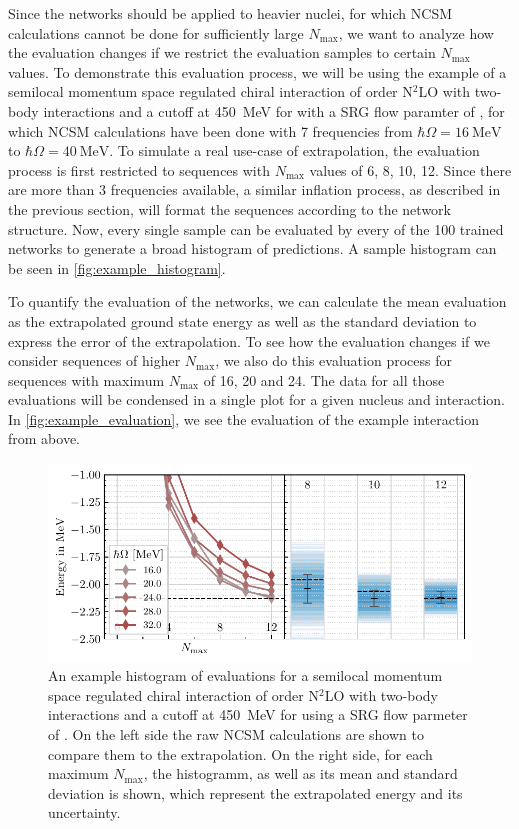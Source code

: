 Since the networks should be applied to heavier nuclei, for which NCSM calculations cannot be done for sufficiently large $N_\mathrm{max}$, we want to analyze how the evaluation changes if we restrict the evaluation samples to certain $N_\mathrm{max}$ values. To demonstrate this evaluation process, we will be using the example of a semilocal momentum space regulated chiral interaction of order N$^{2}$LO with two-body interactions and a cutoff at \SI{450}{\mega\electronvolt} for  with a SRG flow paramter of  \cite{smsquelle}, for which NCSM calculations have been done with 7 frequencies from $\hbar\Omega = \SI{16}{\mega\electronvolt}$ to $\hbar\Omega = \SI{40}{\mega\electronvolt}$. To simulate a real use-case of extrapolation, the evaluation process is first restricted to sequences with $N_\mathrm{max}$ values of 6, 8, 10, 12. Since there are more than 3 frequencies available, a similar inflation process, as described in the previous section, will format the sequences according to the network structure. Now, every single sample can be evaluated by every of the 100 trained networks to generate a broad histogram of predictions. A sample histogram can be seen in \autoref{fig:example_histogram}.


To quantify the evaluation of the networks, we can calculate the mean evaluation as the extrapolated ground state energy as well as the standard deviation to express the error of the extrapolation. To see how the evaluation changes if we consider sequences of higher $N_\mathrm{max}$, we also do this evaluation process for sequences with maximum $N_\mathrm{max}$ of 16, 20 and 24. The data for all those evaluations will be condensed in a single plot for a given nucleus and interaction. In \autoref{fig:example_evaluation}, we see the evaluation of the example interaction from above.

\begin{figure}[H]
  \centering
  \includegraphics[]{media/example_evaluation.pdf}
  \caption{An example histogram of evaluations for a semilocal momentum space regulated chiral interaction of order N$^{2}$LO with two-body interactions and a cutoff at \SI{450}{\mega\electronvolt} \cite{smsquelle} for  using a SRG flow parmeter of . On the left side the raw NCSM calculations are shown to compare them to the extrapolation. On the right side, for each maximum $N_\mathrm{max}$, the histogramm, as well as its mean and standard deviation is shown, which represent the extrapolated energy and its uncertainty.}
  \label{fig:example_evaluation}
\end{figure}
